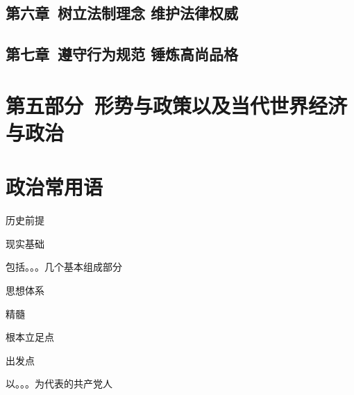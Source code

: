 \documentclass{ctexart}
\begin{document}
\subsection{第六章\ 树立法制理念 维护法律权威}
\subsection{第七章\ 遵守行为规范 锤炼高尚品格} 

\section{第五部分\ 形势与政策以及当代世界经济与政治}

\section{政治常用语}
历史前提

现实基础

包括。。。几个基本组成部分

思想体系

精髓

根本立足点

出发点

以。。。为代表的共产党人
\end{document}
